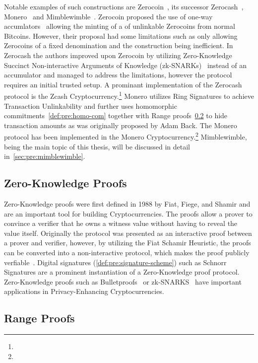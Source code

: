 Notable examples of such constructions are Zerocoin~\cite{miers2013zerocoin}, its successor Zerocash~\cite{sasson2014zerocash}, Monero~\cite{noether2015ring} and Mimblewimble~\cite{jedusor2016mimblewimble}.
Zerocoin proposed the use of one-way accumlators~\cite{benaloh1993one} allowing the minting of a of unlinkable Zerocoins from normal Bitcoins.
However, their proposal had some limitations such as only allowing Zerocoins of a fixed denomination and the construction being inefficient.
In Zerocash the authors improved upon Zerocoin by utilizing Zero-Knowledge Succinct Non-interactive Arguments of Knowledge (zk-SNARKs)~\cite{bitansky2012extractable} instead of an accumulator and managed to address the limitations, however the protocol requires an initial trusted setup.
A prominant implementation of the Zerocash protocol is the Zcash Cryptocurrency.\footnote{\urlzcash}
Monero utilizes Ring Signatures to achieve Transaction Unlinkability and further uses homomorphic commitments~\cref{def:pre:homo-com} together with Range proofs~\cref{sec:pre:rangeproof} to hide transaction amounts as was originally proposed by Adam Back.
The Monero protocol has been implemented in the Monero Cryptocurrency.\footnote{\urlmonero}
Mimblewimble, being the main topic of this thesis, will be discussed in detail in~\cref{sec:pre:mimblewimble}.

\subsection{Zero-Knowledge Proofs} \label{sec:pre:privacy:zeroknowlegde}

Zero-Knowledge proofs were first defined in 1988 by Fiat, Fiege, and Shamir and are an important tool for building Cryptocurrencies.
The proofs allow a prover to convince a verifier that he owns a witness value without having to reveal the value itself.
Originally the protocol was presented as an interactive proof between a prover and verifier, however, by utilizing the Fiat Schamir Heuristic, the proofs can be converted into a non-interactive protocol, which makes the proof publicly verfiable~\cite{feige1988zero}.
Digital signatures (\cref{def:pre:signature-scheme}) such as Schnorr Signatures are a prominent instantiation of a Zero-Knowledge proof protocol.
Zero-Knowledge proofs such as Bulletproofs~\cite{bunz2018bulletproofs} or zk-SNARKS~\cite{bitansky2012extractable} have important applications in Privacy-Enhancing Cryptocurrencies.

\subsection{Range Proofs} \label{sec:pre:rangeproof}


